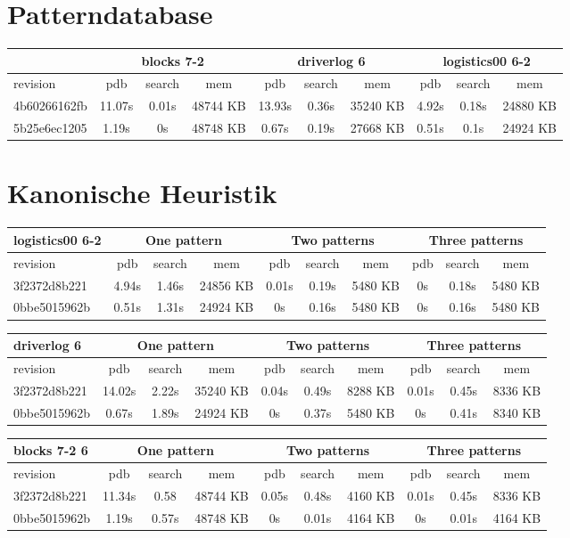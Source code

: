 \documentclass[a4paper,12pt]{scrartcl}
\begin{document}
\section{Patterndatabase}

\begin{tabular}{|l|c|c|c|c|c|c|c|c|c|}\hline
& \multicolumn{3}{c|}{blocks 7-2} & \multicolumn{3}{c|}{driverlog 6} & \multicolumn{3}{c|}{logistics00 6-2}\\\hline
revision & pdb & search & mem & pdb & search & mem & pdb & search & mem\\\hline
4b60266162fb & 11.07s & 0.01s & 48744 KB & 13.93s & 0.36s & 35240 KB & 4.92s & 0.18s & 24880 KB\\\hline
5b25e6ec1205 & 1.19s & 0s & 48748 KB & 0.67s & 0.19s & 27668 KB & 0.51s & 0.1s & 24924 KB\\\hline
\end{tabular}

\section{Kanonische Heuristik}

\begin{tabular}{|l|c|c|c|c|c|c|c|c|c|}\hline
logistics00 6-2 & \multicolumn{3}{c|}{One pattern} & \multicolumn{3}{c|}{Two patterns} & \multicolumn{3}{c|}{Three patterns}\\\hline
revision & pdb & search & mem & pdb & search & mem & pdb & search & mem\\\hline
3f2372d8b221 & 4.94s & 1.46s & 24856 KB & 0.01s & 0.19s & 5480 KB & 0s & 0.18s & 5480 KB\\\hline
0bbe5015962b & 0.51s & 1.31s & 24924 KB & 0s & 0.16s & 5480 KB & 0s & 0.16s & 5480 KB\\\hline
\end{tabular}

\begin{tabular}{|l|c|c|c|c|c|c|c|c|c|}\hline
driverlog 6 & \multicolumn{3}{c|}{One pattern} & \multicolumn{3}{c|}{Two patterns} & \multicolumn{3}{c|}{Three patterns}\\\hline
revision & pdb & search & mem & pdb & search & mem & pdb & search & mem\\\hline
3f2372d8b221 & 14.02s & 2.22s & 35240 KB & 0.04s & 0.49s & 8288 KB & 0.01s & 0.45s & 8336 KB \\\hline
0bbe5015962b & 0.67s & 1.89s & 24924 KB & 0s & 0.37s & 5480 KB & 0s & 0.41s & 8340 KB\\\hline
\end{tabular}

\begin{tabular}{|l|c|c|c|c|c|c|c|c|c|}\hline
blocks 7-2 6 & \multicolumn{3}{c|}{One pattern} & \multicolumn{3}{c|}{Two patterns} & \multicolumn{3}{c|}{Three patterns}\\\hline
revision & pdb & search & mem & pdb & search & mem & pdb & search & mem\\\hline
3f2372d8b221 & 11.34s & 0.58 & 48744 KB & 0.05s & 0.48s & 4160 KB &  0.01s & 0.45s & 8336 KB\\\hline
0bbe5015962b & 1.19s & 0.57s & 48748 KB & 0s & 0.01s & 4164 KB & 0s & 0.01s & 4164 KB\\\hline
\end{tabular}
\end{document}
